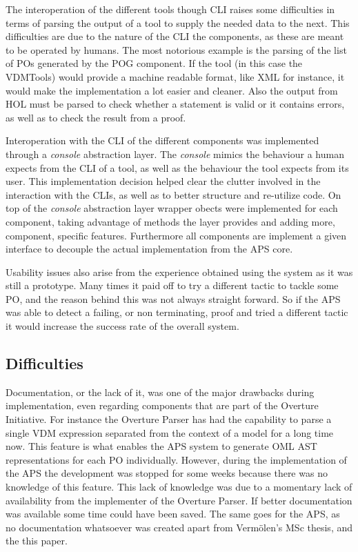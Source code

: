 \documentclass[]{article}
\begin{document}
The interoperation of the different tools though CLI raises some difficulties in terms of parsing the output of a tool to supply the needed data to the next.
This difficulties are due to the nature of the CLI the components, as these are meant to be operated by humans.
The most notorious example is the parsing of the list of POs generated by the POG component.
If the tool (in this case the VDMTools) would provide a machine readable format, like XML for instance, it would make the implementation a lot easier and cleaner.
Also the output from HOL must be parsed to check whether a statement is valid or it contains errors, as well as to check the result from a  proof.

Interoperation with the CLI of the different components was implemented through a \emph{console} abstraction layer.
The \emph{console} mimics the behaviour a human expects from the CLI of a tool, as well as the behaviour the tool expects from its user.
This implementation decision helped clear the clutter involved in the interaction with the CLIs, as well as to better structure and re-utilize code.
On top of the \emph{console} abstraction layer wrapper obects were implemented for each component, taking advantage of methods the layer provides and adding more, component, specific features.
Furthermore all components are implement a given interface to decouple the actual implementation from the APS core.

Usability issues also arise from the experience obtained using the system as it was still a prototype.
Many times it paid off to try a different tactic to tackle some PO, and the reason behind this was not always straight forward.
So if the APS was able to detect a failing, or non terminating, proof and tried a different tactic it would increase the success rate of the overall system.

\subsection{Difficulties}
\label{sub:implementation_difficulties}

Documentation, or the lack of it, was one of the major drawbacks during implementation, even regarding components that are part of the Overture Initiative.
For instance the Overture Parser has had the capability to parse a single VDM expression separated from the context of a model for a long time now.
This feature is what enables the APS system to generate OML AST representations for each PO individually.
However, during the implementation of the APS the development was stopped for some weeks because there was no knowledge of this feature.
This lack of knowledge was due to a momentary lack of availability from the implementer of the Overture Parser.
If better documentation was available some time could have been saved. 
The same goes for the APS, as no documentation whatsoever was created apart from Verm\"olen's MSc thesis, and the this paper.
\end{document}
